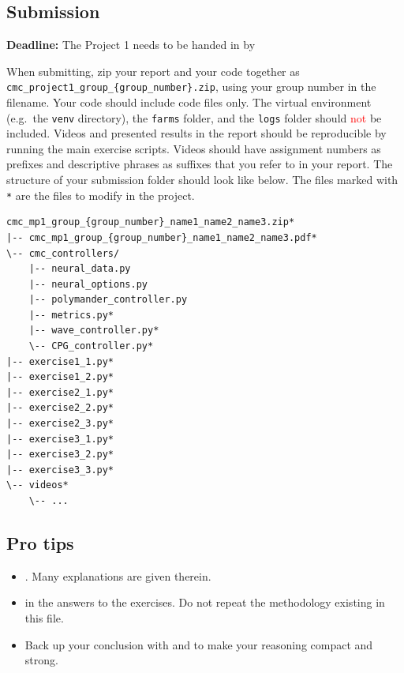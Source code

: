\documentclass{cmc}
\begin{document}
\subsection{Submission}
\textbf{Deadline:} The Project 1 needs to be handed in by 

When submitting, zip your report and your code together as
\nolinkurl{cmc_project1_group_{group_number}.zip}, using your group
number in the filename. Your code should include code files only. The
virtual environment (e.g.\ the \texttt{venv} directory), the
\texttt{farms} folder, and the \texttt{logs} folder should
\textcolor{red}{not} be included. Videos and presented results in the
report should be reproducible by running the main exercise scripts.
Videos should have assignment numbers as prefixes and descriptive
phrases as suffixes that you refer to in your report. The structure of
your submission folder should look like below. The files marked with
\texttt{*} are the files to modify in the project.

\newpage

\begin{lstlisting}[basicstyle=\ttfamily\small]
cmc_mp1_group_{group_number}_name1_name2_name3.zip*
|-- cmc_mp1_group_{group_number}_name1_name2_name3.pdf*
\-- cmc_controllers/
    |-- neural_data.py
    |-- neural_options.py
    |-- polymander_controller.py
    |-- metrics.py*
    |-- wave_controller.py*
    \-- CPG_controller.py*
|-- exercise1_1.py*
|-- exercise1_2.py*
|-- exercise2_1.py*
|-- exercise2_2.py*
|-- exercise2_3.py*
|-- exercise3_1.py*
|-- exercise3_2.py*
|-- exercise3_3.py*
\-- videos*
    \-- ...

\end{lstlisting}

\noindent
\subsection*{Pro tips}\label{subsec:tips}

\begin{itemize}
\item {}. Many explanations are given therein.
\item {} in the answers to the exercises. Do not repeat the methodology existing in this file.
\item  Back up your conclusion with  and  to make your reasoning compact and strong.
\end{itemize}
\end{document}
